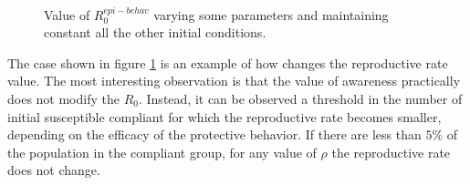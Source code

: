 \begin{figure}[h]
	\centering
	 \quad
	 \\
	\caption[Epidemic behavioral $R_0$ coefficients ]{Value of $R_0^{epi-behav}$ varying some parameters and maintaining constant all the other initial conditions.}
	\label{fig:r0_epi_behav_coef}
\end{figure}


The case shown in figure \ref{fig:r0_epi_behav_coef} is an example of how changes the reproductive rate value. The most interesting observation is that the value of awareness practically does not modify the $R_0$. Instead, it can be observed a threshold in the number of initial susceptible compliant for which the reproductive rate becomes smaller, depending on the efficacy of the protective behavior. If there are less than $5\%$ of the population in the compliant group, for any value of $\rho$ the reproductive rate does not change. 